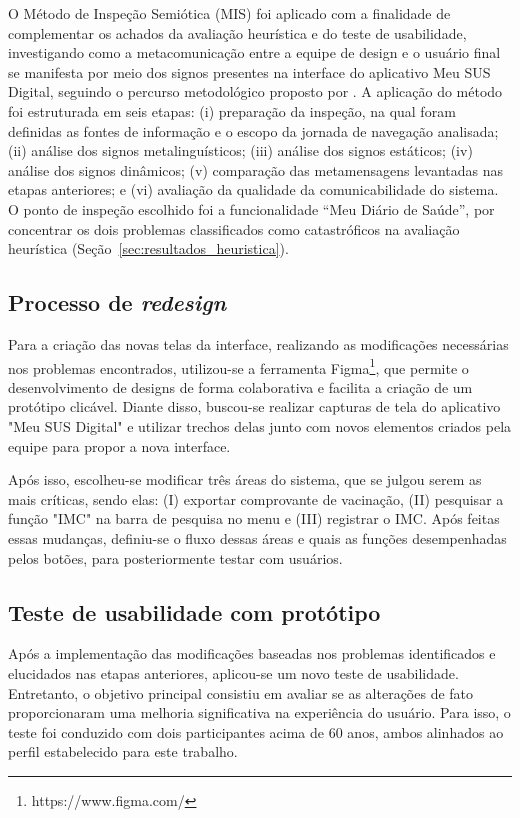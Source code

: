 \documentclass[12pt]{article}
\begin{document}
\begin{abstractp}
O Método de Inspeção Semiótica (MIS) foi aplicado com a finalidade de complementar os achados da avaliação heurística e do teste de usabilidade, investigando como a metacomunicação entre a equipe de design e o usuário final se manifesta por meio dos signos presentes na interface do aplicativo Meu SUS Digital, seguindo o percurso metodológico proposto por \cite{monsalve2011}. A aplicação do método foi estruturada em seis etapas: (i) preparação da inspeção, na qual foram definidas as fontes de informação e o escopo da jornada de navegação analisada; (ii) análise dos signos metalinguísticos; (iii) análise dos signos estáticos; (iv) análise dos signos dinâmicos; (v) comparação das metamensagens levantadas nas etapas anteriores; e (vi) avaliação da qualidade da comunicabilidade do sistema. O ponto de inspeção escolhido foi a funcionalidade ``Meu Diário de Saúde'', por concentrar os dois problemas classificados como catastróficos na avaliação heurística (Seção~\ref{sec:resultados_heuristica}).

\subsection{Processo de \textit{redesign}}\label{sub_redesign}
Para a criação das novas telas da interface, realizando as modificações necessárias nos problemas encontrados, utilizou-se a ferramenta Figma\footnote{https://www.figma.com/}, que permite o desenvolvimento de designs de forma colaborativa e facilita a criação de um protótipo clicável. Diante disso, buscou-se realizar capturas de tela do aplicativo "Meu SUS Digital" e utilizar trechos delas junto com novos elementos criados pela equipe para propor a nova interface.

Após isso, escolheu-se modificar três áreas do sistema, que se julgou serem as mais críticas, sendo elas: (I) exportar comprovante de vacinação, (II) pesquisar a função "IMC" na barra de pesquisa no menu e (III) registrar o IMC. Após feitas essas mudanças, definiu-se o fluxo dessas áreas e quais as funções desempenhadas pelos botões, para posteriormente testar com usuários.

\subsection{Teste de usabilidade com protótipo} \label{sub_usab_prototipo}
Após a implementação das modificações baseadas nos problemas identificados e elucidados nas etapas anteriores, aplicou-se um novo teste de usabilidade. Entretanto, o objetivo principal consistiu em avaliar se as alterações de fato proporcionaram uma melhoria significativa na experiência do usuário. Para isso, o teste foi conduzido com dois participantes acima de 60 anos, ambos alinhados ao perfil estabelecido para este trabalho.


\end{abstractp}
\end{document}
